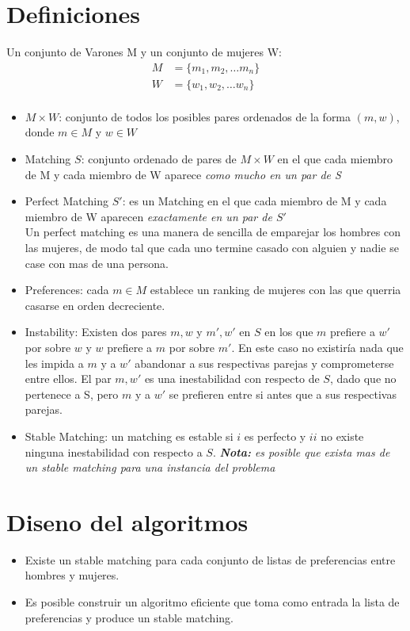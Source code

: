 \documentclass[12pt, fleqn]{article}
\theoremstyle{remark}
\theoremstyle{definition}
\begin{document}
\section{Definiciones}
    Un conjunto de Varones M y un conjunto de mujeres W: 
\[
\begin{split}
    M &= \{m_1,m_2, \dots m_n\} \\
    W &= \{w_1,w_2, \dots w_n\}  \\
\end{split}
\]
\begin{itemize}
    \item $M \times W $: conjunto de todos los posibles pares ordenados de la forma
            $(m, w)$, donde $m \in M$ y  $w \in W$
    \item Matching $S$: conjunto ordenado de pares de $M \times W$ en el que cada
             miembro de M y cada miembro de W aparece \emph{como mucho en un par de S}
    \item Perfect Matching $S'$: es un Matching en el que cada miembro de M y cada miembro 
            de W aparecen \emph{exactamente en un par de $S'$}\\
          Un perfect matching es una manera de sencilla de emparejar los hombres con las 
            mujeres, de modo tal que cada uno termine casado con alguien y nadie se case 
            con mas de una persona.
    \item Preferences: cada $m \in M$ establece un ranking de mujeres con las que
            querria casarse en orden decreciente. 
    \item Instability: Existen dos pares $m,w$ y $m', w'$ en $S$ en los que 
            $m$ prefiere a $w'$ por sobre $w$ y $w$ prefiere a $m$ por sobre $m'$.
          En este caso no existiría nada que les impida a $m$ y a $w'$ abandonar a sus 
          respectivas parejas y comprometerse entre ellos. El par $m,w'$ es una
           inestabilidad con respecto de $S$, dado que no pertenece a S, 
           pero $m$ y a $w'$ se prefieren entre si antes que a sus respectivas parejas.
    \item Stable Matching: un matching es estable si $i$ es perfecto y $ii$ no existe
            ninguna inestabilidad con respecto a $S$. 
            \emph{\textbf{Nota:} es posible que exista mas de un stable matching para una 
                instancia del problema}         
\end{itemize}
\section{Diseno del algoritmos}
\begin{itemize}
    \item Existe un stable matching para cada conjunto de listas de preferencias entre
            hombres y mujeres.
    \item Es posible construir un algoritmo eficiente que toma como entrada 
    la lista de preferencias y produce un stable matching.
\end{itemize}
\end{document}
